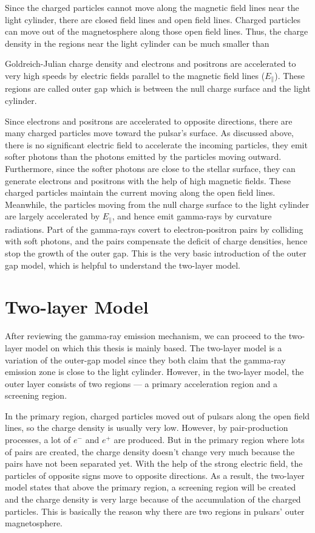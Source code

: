 \documentclass[12pt]{report}
\newcommand{\gj}[0]{
  Goldreich-Julian charge density
}
\begin{document}
    Since the charged particles cannot move along the magnetic field lines near 
    the light cylinder, there are closed field lines and open field lines. Charged 
    particles can move out of the magnetosphere along those open field lines. Thus, the 
    charge density in the regions near the light cylinder can be much smaller than 
    \gj{} and electrons and positrons are accelerated to very high speeds by electric 
    fields parallel to the magnetic field lines ($E_{\parallel}$). These regions are called 
    outer gap which is between the null charge surface and the light cylinder.
    \citep{1986ApJ...300..500C}
    
    Since electrons and positrons are accelerated to opposite directions, there are many 
    charged particles move toward the pulsar's surface. As discussed above, there is no 
    significant electric field to accelerate the incoming particles, they emit softer 
    photons than the photons emitted by the particles moving outward. Furthermore, since the 
    softer photons are close to the stellar surface, they can generate electrons and 
    positrons with the help of high magnetic fields. These charged particles maintain the current 
    moving along the open field lines. Meanwhile, the particles moving from the null charge 
    surface to the light cylinder are largely accelerated by $E_{\parallel}$, and hence 
    emit gamma-rays by curvature radiations. Part of the gamma-rays covert to
    electron-positron pairs by colliding with soft photons, and the pairs compensate 
    the deficit of charge densities, hence stop the growth of the outer gap. This is the 
    very basic introduction of the outer gap model, which is helpful to understand the 
    two-layer model. 
        
  \section{Two-layer Model}
    After reviewing the gamma-ray emission mechanism, we can proceed to
    the two-layer model on which this thesis is mainly based.
    \citep{0004-637X-720-1-178} The two-layer model is a variation of the outer-gap model 
    since they both claim that the gamma-ray emission zone is close to the light cylinder. 
    However, in the two-layer model, the outer layer consists of two regions --- a primary 
    acceleration region and a screening region. 

    In the primary region, charged particles moved out of pulsars along the open field 
    lines, so the charge density is usually very low. 
    However, by pair-production processes, a lot of $e^{-}$ and $e^{+}$ are produced. 
    But in the primary region where lots of pairs are created, the charge density 
    doesn't change very much because the pairs have not been separated yet. With the help 
    of the strong electric field, the particles of opposite signs move to opposite directions. 
    As a result, the two-layer model states that above the primary region, a screening 
    region will be created and the charge density is very large because of the accumulation 
    of the charged particles. This is basically the reason why there are two regions in 
    pulsars' outer magnetosphere.
\end{document}
